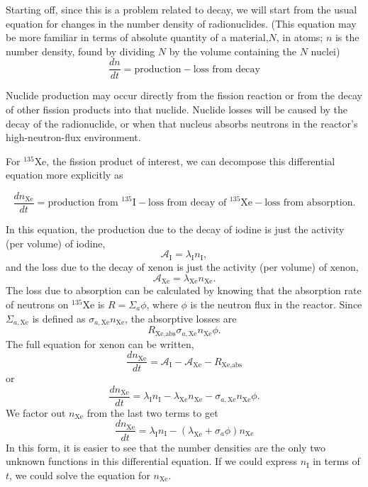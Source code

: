 \documentclass{report}
\begin{document}
Starting off, since this is a problem related to decay, we will start from the usual equation for changes in the number density of radionuclides. (This equation may be more familiar in terms of absolute quantity of a material,$N$, in atoms; $n$ is the number density, found by dividing $N$ by the volume containing the $N$ nuclei)
\begin{equation}
\label{general}
\frac{dn}{dt} = \text{production} - \text{loss from decay}
\end{equation}

Nuclide production may occur directly from the fission reaction or from the decay of other fission products into that nuclide. Nuclide losses will be caused by the decay of the radionuclide, or when that nucleus absorbs neutrons in the reactor's high-neutron-flux environment.

For $^{135}$Xe, the fission product of interest, we can decompose this differential equation more explicitly as

\begin{equation}
\label{text-dn-xenon}
\frac{dn_{\text{Xe}}}{dt} = \text{production from }^{135}\text{I} - \text{loss from decay of }^{135}\text{Xe} - \text{loss from absorption} .
\end{equation}

In this equation, the production due to the decay of iodine is just the activity (per volume) of iodine,
$$ \mathcal{A}_{\text{I}} = \lambda_{\text{I}}n_{\text{I}}, $$
and the loss due to the decay of xenon is just the activity (per volume) of xenon,
$$ \mathcal{A}_{\text{Xe}} = \lambda_{\text{Xe}}n_{\text{Xe}}. $$
The loss due to absorption can be calculated by knowing that the absorption rate of neutrons on $^{135}$Xe is $R = \Sigma_a \phi$, where $\phi$ is the neutron flux in the reactor. Since $\Sigma_{a,\text{Xe}}$ is defined as $\sigma_{a,\text{Xe}} n_{\text{Xe}}$, the absorptive losses are
$$ R_{\text{Xe,abs}} \sigma_{a,\text{Xe}} n_{\text{Xe}} \phi .$$
The full equation for xenon can be written,
$$ \frac{dn_{\text{Xe}}}{dt} = \mathcal{A}_{\text{I}} - \mathcal{A}_{\text{Xe}} - R_{\text{Xe,abs}} $$
or
$$ \frac{dn_{\text{Xe}}}{dt} = \lambda_{\text{I}}n_{\text{I}} - \lambda_{\text{Xe}}n_{\text{Xe}} - \sigma_{a,\text{Xe}} n_{\text{Xe}} \phi .$$
We factor out $n_{\text{Xe}}$ from the last two terms to get
\begin{equation}
\label{dn-xenon}
\frac{dn_{\text{Xe}}}{dt} = \lambda_{\text{I}}n_{\text{I}} - (\lambda_{\text{Xe}} + \sigma_a\phi) n_{\text{Xe}}
\end{equation}
In this form, it is easier to see that the number densities are the only two unknown functions in this differential equation. If we could express $n_{\text{I}}$ in terms of $t$, we could solve the equation for $n_{\text{Xe}}$.
\end{document}
